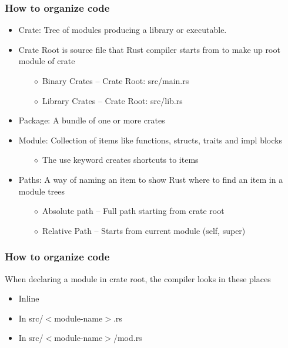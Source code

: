 \documentclass{beamer}
\begin{document}
\begin{frame}
    \frametitle{How to organize code}
    \begin{itemize}
        \item Crate: Tree of modules producing a library or executable.
        \item Crate Root is source file that Rust compiler starts from to make up root module of crate
        \begin{itemize}
            \item[$\diamond$] Binary Crates – Crate Root: src/main.rs
            \item[$\diamond$] Library Crates – Crate Root: src/lib.rs
        \end{itemize}
        \vspace{\baselineskip}
        \item Package: A bundle of one or more crates
        \vspace{\baselineskip}
        \item Module: Collection of items like functions, structs, traits and impl blocks                \begin{itemize}
            \item[$\diamond$] The use keyword creates shortcuts to items
        \end{itemize}
        \vspace{\baselineskip}
        \item Paths: A way of naming an item to show Rust where to find an item in a module trees
        \begin{itemize}
            \item[$\diamond$] Absolute path – Full path starting from crate root
            \item[$\diamond$] Relative Path – Starts from current module (self, super)
        \end{itemize}
    \end{itemize}
\end{frame}


\begin{frame}
    \frametitle{How to organize code}
    When declaring a module in crate root, the compiler looks in these places
    \begin{itemize}
        \item Inline
        \item In src/$<$module-name$>$.rs
        \item In src/$<$module-name$>$/mod.rs
     \end{itemize}
\end{frame}
\end{document}
